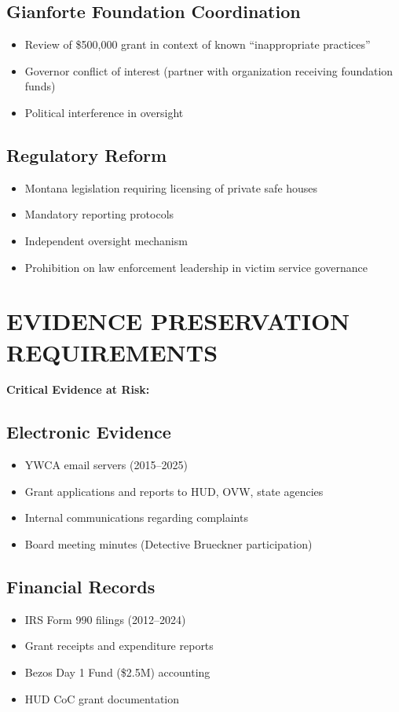 \documentclass[11pt,letterpaper]{article}
\begin{document}
\subsection{Gianforte Foundation Coordination}
\begin{itemize}[leftmargin=*]
\item Review of \$500,000 grant in context of known ``inappropriate practices''
\item Governor conflict of interest (partner with organization receiving foundation funds)
\item Political interference in oversight
\end{itemize}

\subsection{Regulatory Reform}
\begin{itemize}[leftmargin=*]
\item Montana legislation requiring licensing of private safe houses
\item Mandatory reporting protocols
\item Independent oversight mechanism
\item Prohibition on law enforcement leadership in victim service governance
\end{itemize}

\newpage

\section{EVIDENCE PRESERVATION REQUIREMENTS}

\textbf{Critical Evidence at Risk:}

\subsection{Electronic Evidence}
\begin{itemize}[leftmargin=*]
\item YWCA email servers (2015--2025)
\item Grant applications and reports to HUD, OVW, state agencies
\item Internal communications regarding complaints
\item Board meeting minutes (Detective Brueckner participation)
\end{itemize}

\subsection{Financial Records}
\begin{itemize}[leftmargin=*]
\item IRS Form 990 filings (2012--2024)
\item Grant receipts and expenditure reports
\item Bezos Day 1 Fund (\$2.5M) accounting
\item HUD CoC grant documentation
\end{itemize}
\end{document}
